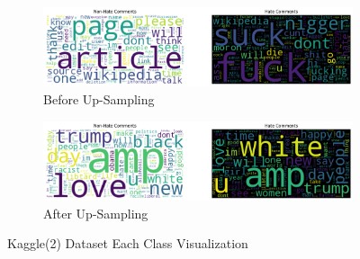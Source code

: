 \documentclass[11pt]{article}
\begin{document}
\begin{figure}[h]
    \centering
    \begin{subfigure}[b]{0.45\textwidth}
        \centering
        \includegraphics[width=\textwidth]{images/hatespeech_visualization/kaggle(2)-before.png}
        \caption{Before Up-Sampling}
        \label{fig:before-kaggle-2} %
    \end{subfigure}
    \hfill
    \begin{subfigure}[b]{0.45\textwidth}
        \centering
        \includegraphics[width=\textwidth]{images/hatespeech_visualization/kaggle(2)-after.png}
        \caption{After Up-Sampling}
        \label{fig:after-kaggle-2}
    \end{subfigure}
    
    \caption{Kaggle(2) Dataset Each Class Visualization}
    \label{fig:data-visualization-kaggle2}
\end{figure}
\end{document}
